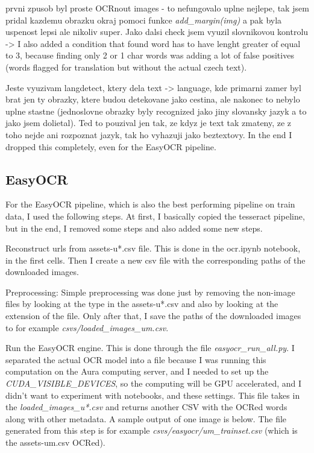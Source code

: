 \documentclass[
  digital,     %
  oneside,     %
  nosansbold,  %
  nocolorbold, %
  nolof,         %
  nolot,         %
]{fithesis4}
\begin{document}
prvni zpusob byl proste OCRnout images - to nefungovalo uplne nejlepe, tak jsem pridal kazdemu obrazku okraj pomoci funkce \emph{add\_margin(img)} a pak byla uspenost lepsi ale nikoliv super. Jako dalsi check jsem vyuzil slovnikovou kontrolu -> I also added a condition that found word has to have lenght greater of equal to 3, because finding only 2 or 1 char words was adding a lot of false positives (words flagged for translation but without the actual czech text).

Jeste vyuzivam langdetect, ktery dela text -> language, kde primarni zamer byl brat jen ty obrazky, ktere budou detekovane jako cestina, ale nakonec to nebylo uplne stastne (jednoslovne obrazky byly recognized jako jiny slovansky jazyk a to jako jsem dolietal). Ted to pouzival jen tak, ze kdyz je text tak zmateny, ze z toho nejde ani rozpoznat jazyk, tak ho vyhazuji jako beztextovy. In the end I dropped this completely, even for the EasyOCR pipeline.

\subsection{EasyOCR}

For the EasyOCR pipeline, which is also the best performing pipeline on train data, I used the following steps. At first, I basically copied the tesseract pipeline, but in the end, I removed some steps and also added some new steps.

Reconstruct urls from assets-u*.csv file. This is done in the ocr.ipynb notebook, in the first cells. Then I create a new csv file with the corresponding paths of the downloaded images.

Preprocessing: Simple preprocessing was done just by removing the non-image files by looking at the type in the assets-u*.csv and also by looking at the extension of the file. Only after that, I save the paths of the downloaded images to for example \emph{csvs/loaded\_images\_um.csv}.

Run the EasyOCR engine. This is done through the file \emph{easyocr\_run\_all.py}. I separated the actual OCR model into a file because I was running this computation on the Aura computing server, and I needed to set up the \emph{CUDA\_VISIBLE\_DEVICES}, so the computing will be GPU accelerated, and I didn't want to experiment with notebooks, and these settings. This file takes in the \emph{loaded\_images\_u*.csv} and returns another CSV with the OCRed words along with other metadata. A sample output of one image is below. The file generated from this step is for example \emph{csvs/easyocr/um\_trainset.csv} (which is the assets-um.csv OCRed).
\end{document}
